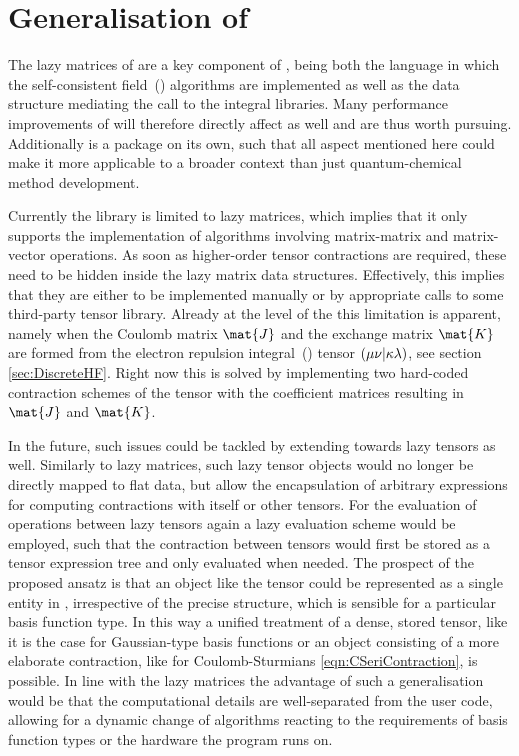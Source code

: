 \section{Generalisation of \lazyten}
\label{sec:GeneraliseLazyten}
The lazy matrices of \lazyten are a key component of \molsturm,
being both the language in which the self-consistent field~(\SCF)
algorithms are implemented
as well as the data structure
mediating the call to the integral libraries.
Many performance improvements of \lazyten will therefore
directly affect \molsturm as well and are thus worth pursuing.
Additionally \lazyten is a package on its own,
such that all aspect mentioned here could make it more
applicable to a broader context than just
quantum-chemical method development.

Currently the \lazyten library is limited to lazy matrices,
which implies that it only supports the implementation of algorithms
involving matrix-matrix and matrix-vector operations.
As soon as higher-order tensor contractions are required,
these need to be hidden inside the lazy matrix data structures.
Effectively, this implies
that they are either to be implemented manually
or by appropriate calls to some third-party tensor library.
Already at the level of the \SCF
this limitation is apparent,
namely when the Coulomb matrix $\mat{J}$
and the exchange matrix $\mat{K}$ are formed
from the electron repulsion integral~(\ERI) tensor
$\left( \mu\nu \middle| \kappa\lambda \right)$, see section \vref{sec:DiscreteHF}.
Right now this is solved by implementing two
hard-coded contraction schemes of the \ERI tensor with
the coefficient matrices resulting in $\mat{J}$ and $\mat{K}$.

In the future, such issues could be tackled
by extending \lazyten towards lazy tensors as well.
Similarly to lazy matrices,
such lazy tensor objects would no longer be
directly mapped to flat data,
but allow the encapsulation of arbitrary expressions
for computing contractions with itself or other tensors.
For the evaluation of operations between lazy tensors
again a lazy evaluation scheme would be employed,
such that the contraction between tensors would first be
stored as a tensor expression tree and only evaluated when needed.
The prospect of the proposed ansatz is
that an object like the \ERI tensor
could be represented as a single entity in \molsturm,
irrespective of the precise structure,
which is sensible for a particular basis function type.
In this way a unified treatment
of a dense, stored \ERI tensor,
like it is the case for Gaussian-type basis functions
or an object consisting of a more elaborate contraction,
like for Coulomb-Sturmians \eqref{eqn:CSeriContraction},
is possible.
In line with the lazy matrices the advantage of such a
generalisation would be that the computational details
are well-separated from the user code,
allowing for a dynamic change of algorithms
reacting to the requirements of basis function types
or the hardware the program runs on.

